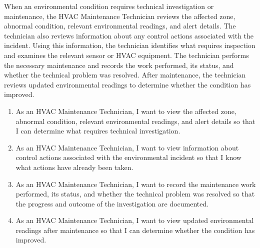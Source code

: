 \documentclass[11pt,a4paper]{article}
\begin{document}
When an environmental condition requires technical investigation or maintenance, the HVAC Maintenance Technician reviews the affected zone, abnormal condition, relevant environmental readings, and alert details. The technician also reviews information about any control actions associated with the incident. Using this information, the technician identifies what requires inspection and examines the relevant sensor or HVAC equipment. The technician performs the necessary maintenance and records the work performed, its status, and whether the technical problem was resolved. After maintenance, the technician reviews updated environmental readings to determine whether the condition has improved.

\begin{enumerate}[itemsep=3pt]
\item As an HVAC Maintenance Technician, I want to view the affected zone, abnormal condition, relevant environmental readings, and alert details so that I can determine what requires technical investigation.
\item As an HVAC Maintenance Technician, I want to view information about control actions associated with the environmental incident so that I know what actions have already been taken.
\item As an HVAC Maintenance Technician, I want to record the maintenance work performed, its status, and whether the technical problem was resolved so that the progress and outcome of the investigation are documented.
\item As an HVAC Maintenance Technician, I want to view updated environmental readings after maintenance so that I can determine whether the condition has improved.
\end{enumerate}
\end{document}
